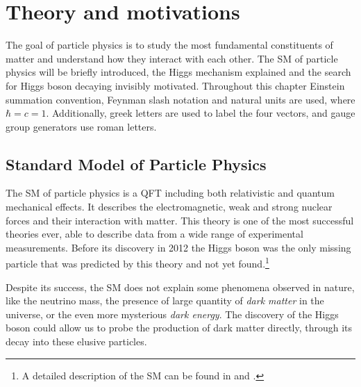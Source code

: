 \chapter{Theory and motivations}
\label{CHAPTER:TheoryAndMotivations}

\glsresetall %


The goal of particle physics is to study the most fundamental constituents of matter and understand how they interact with each other. The \gls{SM} of particle physics will be briefly introduced, the Higgs mechanism explained and the search for Higgs boson decaying invisibly motivated. Throughout this chapter Einstein summation convention, Feynman slash notation and natural units are used, where $\hbar=c=1$. Additionally, greek letters are used to label the four vectors, and gauge group generators use roman letters.

\section{Standard Model of Particle Physics}


The \gls{SM} of particle physics is a \gls{QFT} including both relativistic and quantum mechanical effects. It describes the electromagnetic, weak and strong nuclear forces and their interaction with matter. This theory is one of the most successful theories ever, able to describe data from a wide range of experimental measurements. Before its discovery in 2012 \cite{ARTICLE:ATLAS_HiggsDiscovery,ARTICLE:CMS_HiggsDiscovery} the Higgs boson was the only missing particle that was predicted by this theory and not yet found.\footnote{A detailed description of the \gls{SM} can be found in \cite{BOOK:Griffiths} and \cite{BOOK:halzen1984quarks}.}

Despite its success, the \gls{SM} does not explain some phenomena observed in nature, like the neutrino mass, the presence of large quantity of \textit{dark matter} in the universe, or the even more mysterious \textit{dark energy}. The discovery of the Higgs boson could allow us to probe the production of dark matter directly, through its decay into these elusive particles. 

